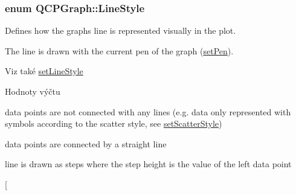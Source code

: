 \subsubsection[{Line\+Style}]{\setlength{\rightskip}{0pt plus 5cm}enum {\bf Q\+C\+P\+Graph\+::\+Line\+Style}}\label{classQCPGraph_ad60175cd9b5cac937c5ee685c32c0859}


Defines how the graph\textquotesingle{}s line is represented visually in the plot. 

The line is drawn with the current pen of the graph (\hyperlink{classQCPAbstractPlottable_ab74b09ae4c0e7e13142fe4b5bf46cac7}{set\+Pen}). \begin{DoxySeeAlso}{Viz také}
\hyperlink{classQCPGraph_a513fecccff5b2a50ce53f665338c60ff}{set\+Line\+Style} 
\end{DoxySeeAlso}
\begin{Desc}
\item[Hodnoty výčtu]\par
\begin{description}
\item[{\em 
\hypertarget{classQCPGraph_ad60175cd9b5cac937c5ee685c32c0859aea9591b933733cc7b20786b71e60fa04}{}ls\+None\label{classQCPGraph_ad60175cd9b5cac937c5ee685c32c0859aea9591b933733cc7b20786b71e60fa04}
}]data points are not connected with any lines (e.\+g. data only represented with symbols according to the scatter style, see \hyperlink{classQCPGraph_a12bd17a8ba21983163ec5d8f42a9fea5}{set\+Scatter\+Style}) \item[{\em 
\hypertarget{classQCPGraph_ad60175cd9b5cac937c5ee685c32c0859a3c42a27b15aa3c92d399082fad8b7515}{}ls\+Line\label{classQCPGraph_ad60175cd9b5cac937c5ee685c32c0859a3c42a27b15aa3c92d399082fad8b7515}
}]data points are connected by a straight line \item[{\em 
\hypertarget{classQCPGraph_ad60175cd9b5cac937c5ee685c32c0859ae10568bda57836487d9dec5eba1d6c6e}{}ls\+Step\+Left\label{classQCPGraph_ad60175cd9b5cac937c5ee685c32c0859ae10568bda57836487d9dec5eba1d6c6e}
}]line is drawn as steps where the step height is the value of the left data point \item[{\em 
}
\end{description}
\end{Desc}
